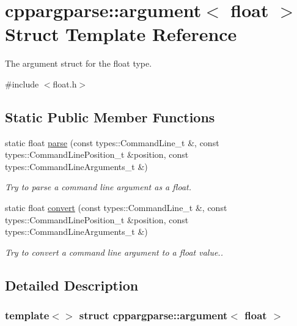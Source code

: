 \hypertarget{structcppargparse_1_1argument_3_01float_01_4}{}\section{cppargparse\+:\+:argument$<$ float $>$ Struct Template Reference}
\label{structcppargparse_1_1argument_3_01float_01_4}


The argument struct for the float type.  




{\ttfamily \#include $<$float.\+h$>$}

\subsection*{Static Public Member Functions}
\begin{DoxyCompactItemize}
\item 
static float \hyperlink{structcppargparse_1_1argument_3_01float_01_4_a6c02321d1fcc25ffa950948ab642e64f}{parse} (const types\+::\+Command\+Line\+\_\+t \&, const types\+::\+Command\+Line\+Position\+\_\+t \&position, const types\+::\+Command\+Line\+Arguments\+\_\+t \&)
\begin{DoxyCompactList}\small\item\em Try to parse a command line argument as a float. \end{DoxyCompactList}\item 
static float \hyperlink{structcppargparse_1_1argument_3_01float_01_4_a3dd5dba91fc35f277138619066d7db24}{convert} (const types\+::\+Command\+Line\+\_\+t \&, const types\+::\+Command\+Line\+Position\+\_\+t \&position, const types\+::\+Command\+Line\+Arguments\+\_\+t \&)
\begin{DoxyCompactList}\small\item\em Try to convert a command line argument to a float value.. \end{DoxyCompactList}\end{DoxyCompactItemize}


\subsection{Detailed Description}
\subsubsection*{template$<$$>$\newline
struct cppargparse\+::argument$<$ float $>$}

